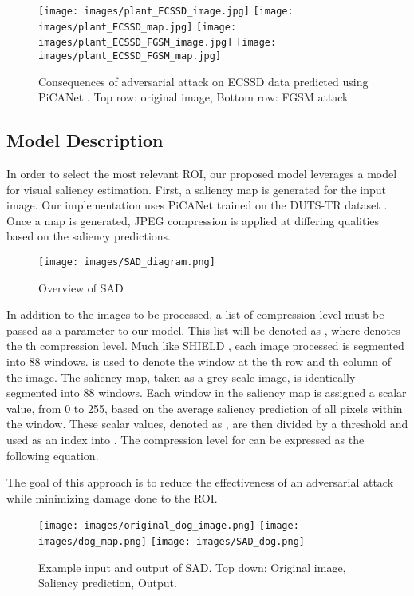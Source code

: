 \documentclass[10pt,twocolumn,letterpaper]{article}
\begin{document}
\begin{figure}[hbt]
\centering
  \texttt{[image: images/plant\_ECSSD\_image.jpg]}
  \texttt{[image: images/plant\_ECSSD\_map.jpg]}
\texttt{[image: images/plant\_ECSSD\_FGSM\_image.jpg]}
  \texttt{[image: images/plant\_ECSSD\_FGSM\_map.jpg]}
  \caption{
  Consequences of adversarial attack on ECSSD data \cite{ECSSD} predicted using PiCANet \cite{liu2018picanet}. Top row: original image, Bottom row: FGSM attack \cite{FGSM}
  }
  \label{fig:sample_attack}
\end{figure}


\subsection{Model Description}
In order to select the most relevant ROI, our proposed model leverages a model for visual saliency estimation.
First, a saliency map is generated for the input image. Our implementation uses PiCANet \cite{liu2018picanet} trained on the DUTS-TR dataset \cite{Wang_2017_CVPR}. Once a map is generated, JPEG compression is applied at differing qualities based on the saliency predictions.

\begin{figure}[h]
  \texttt{[image: images/SAD\_diagram.png]}
  \caption{Overview of SAD
  }
  \label{fig:architecture}
\end{figure}

In addition to the images to be processed, a list of compression level must be passed as a parameter to our model. This list will be denoted as , where  denotes the th compression level.
Much like SHIELD \cite{das2018shield}, each image processed is segmented into 88 windows.  is used to denote the window at the th row and th column of the image.
The saliency map, taken as a grey-scale image, is identically segmented into 88 windows. Each window in the saliency map is assigned a scalar value, from 0 to 255, based on the average saliency prediction of all pixels within the window. These scalar values, denoted as , are then divided by a threshold and used as an index into . The compression level  for  can be expressed as the following equation.



The goal of this approach is to reduce the effectiveness of an adversarial attack while minimizing damage done to the ROI.

\begin{figure}[hbt]
\centering
  \texttt{[image: images/original\_dog\_image.png]}
  \texttt{[image: images/dog\_map.png]}
  \texttt{[image: images/SAD\_dog.png]}

  \caption{
  Example input and output of SAD. Top down: Original image, Saliency prediction, Output.
  }
  \label{fig:sample_defense}
\end{figure}
\end{document}
